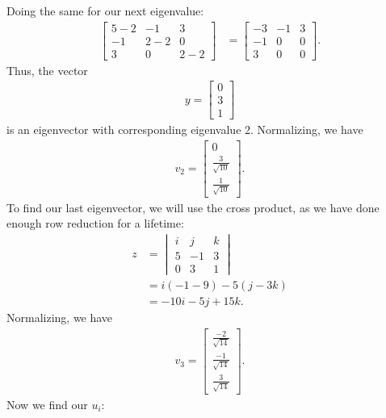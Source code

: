 \documentclass[10pt,a4paper]{article}
\theoremstyle{definition}
\begin{document}
Doing the same for our next eigenvalue:
\begin{align*}
\begin{bmatrix}
5 - 2 & -1 & 3\\
-1 & 2 - 2 & 0\\
3 & 0 & 2 - 2
\end{bmatrix} &= \begin{bmatrix}
-3 & -1 & 3\\
-1 & 0 & 0\\
3 & 0 & 0
\end{bmatrix}.
\end{align*}
Thus, the vector 
\begin{align*}
y = \begin{bmatrix}
0\\
3\\
1
\end{bmatrix}
\end{align*}
is an eigenvector with corresponding eigenvalue 2. Normalizing, we have 
\begin{align*}
v_2 = \begin{bmatrix}
0\\
\frac{3}{\sqrt{10}}\\
\frac{1}{\sqrt{10}}
\end{bmatrix}.
\end{align*}
To find our last eigenvector, we will use the cross product, as we have done enough row reduction for a lifetime:
\begin{align*}
z &= \begin{vmatrix}
i & j & k\\
5 & -1 & 3\\
0 & 3 & 1
\end{vmatrix}\\
&= i (-1 - 9) - 5 (j - 3k)\\
&= -10i -5j + 15k.
\end{align*}
Normalizing, we have
\begin{align*}
v_3 = \begin{bmatrix}
\frac{-2}{\sqrt{14}}\\
\frac{-1}{\sqrt{14}}\\
\frac{3}{\sqrt{14}}
\end{bmatrix}.
\end{align*}
Now we find our $u_i$:
\end{document}
